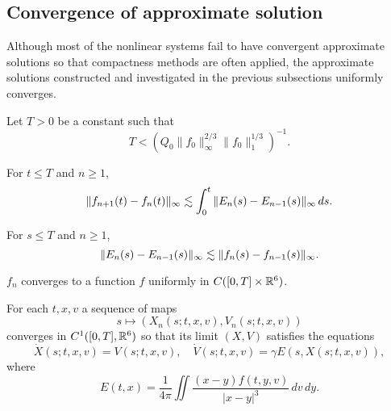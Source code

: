 \documentclass[11pt]{amsart}
\begin{document}
\subsection{Convergence of approximate solution}
Although most of the nonlinear systems fail to have convergent approximate solutions so that compactness methods are often applied, the approximate solutions constructed and investigated in the previous subsections uniformly converges.
\begin{lem}
Let $T>0$ be a constant such that
\[T<(Q_0\|f_0\|_\infty^{2/3}\|f_0\|_1^{1/3})^{-1}.\]
\begin{cond}
\item
For $t\le T$ and $n\ge1$,
\[\|f_{n+1}(t)-f_n(t)\|_\infty\lesssim\int_0^t\|E_n(s)-E_{n-1}(s)\|_\infty\,ds.\]
\item
For $s\le T$ and $n\ge1$,
\[\|E_n(s)-E_{n-1}(s)\|_\infty\lesssim\|f_n(s)-f_{n-1}(s)\|_\infty.\]
\item $f_n$ converges to a function $f$ uniformly in $C([0,T]\times\mathbb{R}^6)$.
\item For each $t,x,v$ a sequence of maps
\[s\mapsto(X_n(s;t,x,v),V_n(s;t,x,v))\]
converges in $C^1([0,T],\mathbb{R}^6)$ so that its limit $(X,V)$ satisfies the equations
\[\dot X(s;t,x,v)=V(s;t,x,v),\quad\dot V(s;t,x,v)=\gamma E(s,X(s;t,x,v)),\]
where
\[E(t,x)=\frac1{4\pi}\iint\frac{(x-y)f(t,y,v)}{|x-y|^3}\,dv\,dy.\]
\end{cond}
\end{lem}
\end{document}
